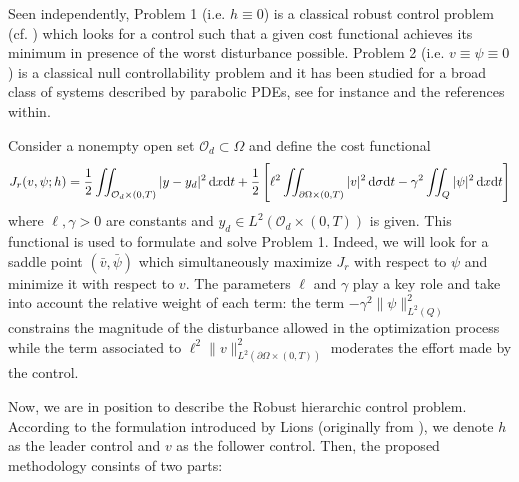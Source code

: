 \documentclass[preprint,10pt]{article}
\numberwithin{equation}{section}
\numberwithin{theorem}{section}
\def\dx{\,\textnormal{d}x}
\def\dt{\textnormal{d}t}
\def\d{\,\textnormal{d}}
\def\dx{\,\textnormal{d}x}
\def\dt{\textnormal{d}t}
\def\d{\,\textnormal{d}}
\begin{document}
{Seen independently, Problem 1 (i.e. $h\equiv 0$) is a classical robust control problem (cf. \cite{temam,temam_nonlinear,aziz}) which looks for a control such that a given cost functional achieves its minimum in presence of the worst disturbance possible. Problem 2 (i.e. $v\equiv\psi\equiv 0$) is a classical null controllability problem and it has been studied for a broad class of systems described by parabolic PDEs, see for instance \cite{cara_guerrero} and the references within.

Consider a nonempty open set $\mathcal O_d\subset \Omega$ and define the cost functional
%
\begin{equation}\label{func_rob}
J_r(v,\psi;h)=\frac{1}{2}\iint_{\mathcal O_d\times(0,T)}|y-y_d|^2\dx\dt+\frac{1}{2}\left[\ell^2\iint_{\partial \Omega\times(0,T)}|v|^2\d\sigma\dt-\gamma^2\iint_Q|\psi|^2\dx\dt\right]
\end{equation}
%
%
where $\ell,\gamma>0$ are constants and $y_d\in L^2(\mathcal O_d\times(0,T))$ is given. This functional is used to formulate and solve Problem 1. Indeed, we will look for a saddle point $(\bar v,\bar \psi)$ which simultaneously maximize $J_r$ with respect to $\psi$ and minimize it with respect to $v$. The parameters $\ell$ and $\gamma$ play a key role and take into account the relative weight of each term: the term $-\gamma^2\|\psi\|^2_{L^2(Q)}$ constrains the magnitude of the disturbance allowed in the optimization process while the term associated to $\ell^2\|v\|^2_{L^2(\partial\Omega\times(0,T))}$ moderates the effort made by the control. 

Now, we are in position to describe the Robust hierarchic control problem. According to the formulation introduced by Lions \cite{LionsSta} (originally from \cite{Stackelber}), we denote $h$ as the leader control and $v$ as the follower control. Then, the proposed methodology consints of two parts:

}
\end{document}
